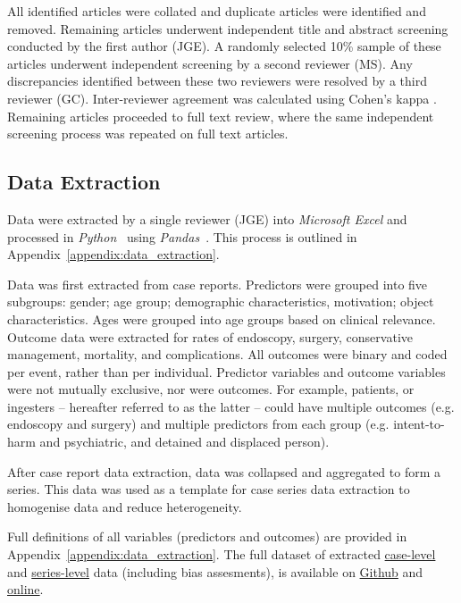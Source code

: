 \documentclass[pdflatex,sn-basic,Numbered]{sn-jnl}
\begin{document}
All identified articles were collated and duplicate articles were identified and removed. Remaining articles underwent independent title and abstract screening conducted by the first author (JGE). A randomly selected 10\% sample of these articles underwent independent screening by a second reviewer (MS). Any discrepancies identified between these two reviewers were resolved by a third reviewer (GC). Inter-reviewer agreement was calculated using Cohen's kappa \cite{Machin_2008}. Remaining articles proceeded to full text review, where the same independent screening process was repeated on full text articles.

\subsection{Data Extraction}

\noindent Data were extracted by a single reviewer (JGE) into \textit{Microsoft Excel} \cite{MicrosoftCorporation_2025} and processed in \textit{Python}~\cite{PythonSoftwareFoundation_2025} using \textit{Pandas}~\cite{ThePandasDevelopmentTeam_2020}. This process is outlined in Appendix~\ref{appendix:data_extraction}. 

Data was first extracted from case reports. Predictors were grouped into five subgroups: gender; age group; demographic characteristics, motivation; object characteristics. Ages were grouped into age groups based on clinical relevance. Outcome data were extracted for rates of endoscopy, surgery, conservative management, mortality, and complications. All outcomes were binary and coded per event, rather than per individual. Predictor variables and outcome variables were not mutually exclusive, nor were outcomes. For example, patients, or ingesters -- hereafter referred to as the latter -- could have multiple outcomes (e.g. endoscopy and surgery) and multiple predictors from each group (e.g. intent-to-harm and psychiatric, and detained and displaced person).

After case report data extraction, data was collapsed and aggregated to form a series. This data was used as a template for case series data extraction to homogenise data and reduce heterogeneity. 

Full definitions of all variables (predictors and outcomes) are provided in Appendix~\ref{appendix:data_extraction}. The full dataset of extracted \href{https://github.com/jackgedge/iifo_systematic_review/blob/main/input/processed_data/final_report/case_data_export.csv}{case-level} and \href{https://github.com/jackgedge/iifo_systematic_review/blob/main/input/processed_data/final_report/aggregate_series_data_export.csv}{series-level} data (including bias assesments), is available on \href{https://github.com/jackgedge/iifo_systematic_review/blob/main/input/processed_data/final_report/}{Github} and \href{https://qmro.qmul.ac.uk/xmlui/handle/123456789/113411/}{online}.
\end{document}
